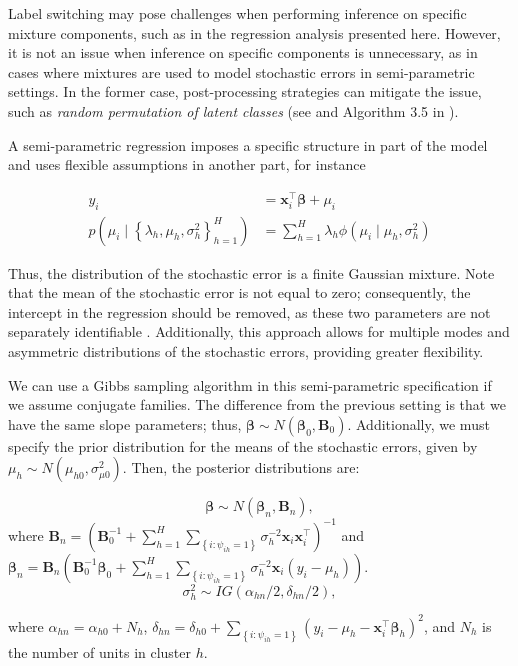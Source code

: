Label switching may pose challenges when performing inference on specific mixture components, such as in the regression analysis presented here. However, it is not an issue when inference on specific components is unnecessary, as in cases where mixtures are used to model stochastic errors in semi-parametric settings. In the former case, post-processing strategies can mitigate the issue, such as \textit{random permutation of latent classes} (see \cite[p.~534]{gelman2021bayesian} and Algorithm 3.5 in \cite[p.~82]{fruhwirth2006finite}). 

A semi-parametric regression imposes a specific structure in part of the model and uses flexible assumptions in another part, for instance

\begin{align*}
	y_i&=\bm{x}_i^{\top}\bm{\beta}+\mu_i\\
	p(\mu_i \mid \left\{\lambda_h,\mu_h,\sigma_h^2\right\}_{h=1}^H)&=\sum_{h=1}^H\lambda_h\phi(\mu_i\mid \mu_h,\sigma_h^2) 
\end{align*}

Thus, the distribution of the stochastic error is a finite Gaussian mixture. Note that the mean of the stochastic error is not equal to zero; consequently, the intercept in the regression should be removed, as these two parameters are not separately identifiable \cite{van2011bayesian}. Additionally, this approach allows for multiple modes and asymmetric distributions of the stochastic errors, providing greater flexibility.

We can use a Gibbs sampling algorithm in this semi-parametric specification if we assume conjugate families. The difference from the previous setting is that we have the same slope parameters; thus, $\bm{\beta} \sim N(\bm{\beta}_{0},\bm{B}_{0})$. Additionally, we must specify the prior distribution for the means of the stochastic errors, given by $\mu_h \sim N(\mu_{h0},\sigma^2_{\mu 0})$. Then, the posterior distributions are:

$$\bm{\beta}\sim N(\bm{\beta}_{n},\bm{B}_{n}),$$ where $\bm{B}_{n}=(\bm{B}_{0}^{-1}+\sum_{h=1}^H\sum_{\left\{i:  \psi_{ih}=1\right\}}\sigma_h^{-2}\bm{x}_i\bm{x}_i^{\top})^{-1}$ and $\bm{\beta}_{n}=\bm{B}_{n}(\bm{B}_{0}^{-1}\bm{\beta}_{0}+\sum_{h=1}^H\sum_{\left\{i:  \psi_{ih}=1\right\}}\sigma_h^{-2}\bm{x}_i(y_i-\mu_h))$.
$$\sigma_h^2\sim IG(\alpha_{hn}/2,\delta_{hn}/2),$$

where $\alpha_{hn}=\alpha_{h0}+N_h$, $\delta_{hn}=\delta_{h0}+\sum_{\left\{i:  \psi_{ih}=1\right\}}(y_i-\mu_h-\bm{x}_i^{\top}\bm{\beta}_h)^2$, and $N_h$ is the number of units in cluster $h$.

